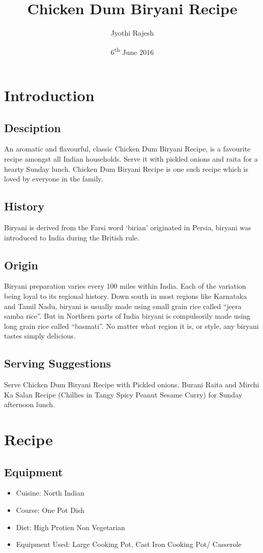 \documentclass{recipe}
\author{Jyothi Rajesh}
\title{Chicken Dum Biryani Recipe}
\date{6\textsuperscript{th} June 2016}
\begin{document}
    \maketitle   
    \section{Introduction}
        \subsection{Desciption}
            An aromatic and flavourful, classic Chicken Dum Biryani Recipe, is a favourite recipe amongst all Indian households. Serve it with pickled onions and raita for a hearty Sunday lunch.   
        Chicken Dum Biryani Recipe is one such recipe which is loved by everyone in the family.
        \subsection{History}
            Biryani is derived from the Farsi word ‘birian’ originated in Persia, biryani was introduced to India during the British rule.
        \subsection{Origin}
            Biryani preparation varies every 100 miles within India. Each of the variation being loyal to its regional history. Down south in most regions like Karnataka and Tamil Nadu, biryani is usually made using small grain rice called “jeera samba rice”. But in Northern parts of India biryani is compulsorily made using long grain rice called “basmati”. No matter what region it is, or style, any biryani tastes simply delicious. 
        \subsection{Serving Suggestions}
            Serve Chicken Dum Biryani Recipe with Pickled onions, Burani Raita and Mirchi Ka Salan Recipe (Chillies in Tangy Spicy Peanut Sesame Curry) for Sunday afternoon lunch. 
    \section{Recipe}
        \subsection{Equipment}
            \begin{itemize}
                \item Cuisine:  North Indian
                \item Course:   One Pot Dish
                \item Diet:     High Protien Non Vegetarian
                \item Equipment Used:   	Large Cooking Pot, Cast Iron Cooking Pot/ Casserole
            \end{itemize}
\end{document}

